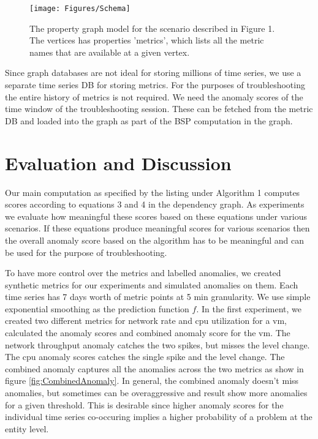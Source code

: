\documentclass[times, twoside, watermark]{zHenriquesLab-StyleBioRxiv}
\begin{document}
\begin{figure}%
\centering
\texttt{[image: Figures/Schema]}
\caption{The property graph model for the scenario described in Figure 1. The vertices has properties 'metrics', which lists all the metric names that are available at a given vertex.}
\label{fig:schema}
\end{figure}

Since graph databases are not ideal for storing millions of time series, we use a separate time series DB for storing metrics. For the purposes of troubleshooting the entire history of metrics is not required. We need the anomaly scores of the time window of the troubleshooting session. These can be fetched from the metric DB and loaded into the graph as part of the BSP computation in the graph.
	
\section*{Evaluation and Discussion}
Our main computation as specified by the listing under Algorithm 1 computes scores according to equations 3 and 4 in the dependency graph. As experiments we evaluate how meaningful these scores based on these equations under various scenarios. If these equations produce meaningful scores for various scenarios then the overall anomaly score based on the algorithm has to be meaningful and can be used for the purpose of troubleshooting.

To have more control over the metrics and labelled anomalies, we created synthetic metrics for our experiments and simulated anomalies on them. Each time series has 7 days worth of metric points at 5 min granularity. We use simple exponential smoothing \cite{expsmoothing} as the prediction function $f$. In the first experiment, we created two different metrics for network rate and cpu utilization for a vm, calculated the anomaly scores and combined anomaly score for the vm. The network throughput anomaly catches the two spikes, but misses the level change. The cpu anomaly scores catches the single spike and the level change. The combined anomaly captures all the anomalies across the two metrics as show in figure \ref{fig:CombinedAnomaly}. In general, the combined anomaly doesn't miss anomalies, but sometimes can be overaggressive and result show more anomalies for a given threshold. This is desirable since higher anomaly scores for the individual time series co-occuring implies a higher probability of a problem at the entity level.
\end{document}
